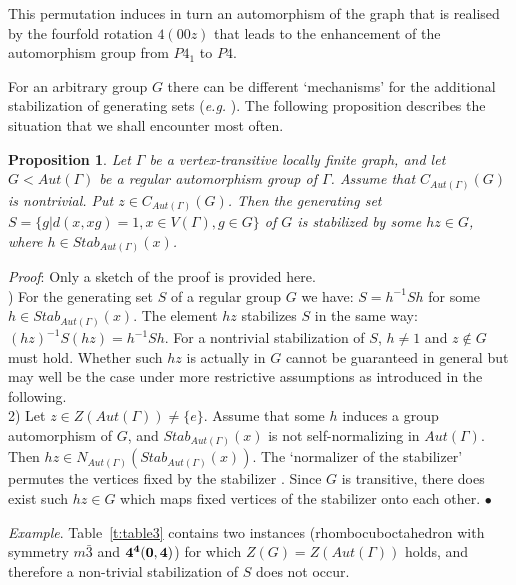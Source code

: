 \documentclass[11pt,a4paper]{article}
\newtheorem{prop}{Proposition} %
\newenvironment{proof}    {{\noindent \it Proof}:}{{\fillbox \medskip}} %
\newcommand{\fillbox}{\mbox{$\bullet$}}
\begin{document}
\noindent This permutation induces in turn an automorphism of the graph that is realised by the fourfold rotation $4(00z)$ that leads to the enhancement of the automorphism group from $P4_1$ to $P4$.

\medskip

For an arbitrary group $G$ there can be different `mechanisms' for the additional stabilization of generating sets (\emph{e.g.} \cite{Watk71}). The following proposition describes the situation that we shall encounter most often. %

\begin{prop}
\label{prop2}
Let $\Gamma$ be a vertex-transitive locally finite graph, and let $G < Aut(\Gamma)$ be a regular automorphism group of $\Gamma$. Assume that $C_{Aut(\Gamma)}(G)$ is nontrivial. Put $z \in C_{Aut(\Gamma)}(G)$. Then the generating set $S = \{g | d(x, xg) = 1, x \in V(\Gamma), g \in G \}$ of $G$ is stabilized by some $hz \in G$, where $h \in Stab_{Aut(\Gamma)}(x)$. %
\end{prop}

\begin{proof} Only a sketch of the proof is provided here.\\
) For the generating set $S$ of a regular group $G$ we have: $S = h^{-1}Sh$ for some $h \in Stab_{Aut(\Gamma)}(x)$. The element $hz$ stabilizes $S$ in the same way: $(hz)^{-1}S(hz) = h^{-1}Sh$. For a nontrivial stabilization of $S$, $h \neq 1$ and $z \notin G$ must hold. Whether such $hz$ is actually in $G$ cannot be guaranteed in general but may well be the case under more restrictive assumptions as introduced in the following. \\
2) Let $z \in Z(Aut(\Gamma)) \neq \{e\}$. Assume that some $h$ induces a group automorphism of $G$, and $Stab_{Aut(\Gamma)}(x)$ is not self-normalizing in $Aut(\Gamma)$. Then $hz \in N_{Aut(\Gamma)}(Stab_{Aut(\Gamma)}(x))$. The `normalizer of the stabilizer' permutes the vertices fixed by the stabilizer \cite{Wie64}. Since $G$ is transitive, there does exist such $hz \in G$ which maps fixed vertices of the stabilizer onto each other.
\end{proof}

\medskip

\noindent \emph{Example}. Table~\ref{t:table3} contains two instances (rhombocuboctahedron with symmetry $m\bar3$ and $\bf 4^4(0, 4)$) for which $Z(G) = Z(Aut(\Gamma))$ holds, and therefore a non-trivial stabilization of $S$ does not occur.
\end{document}
